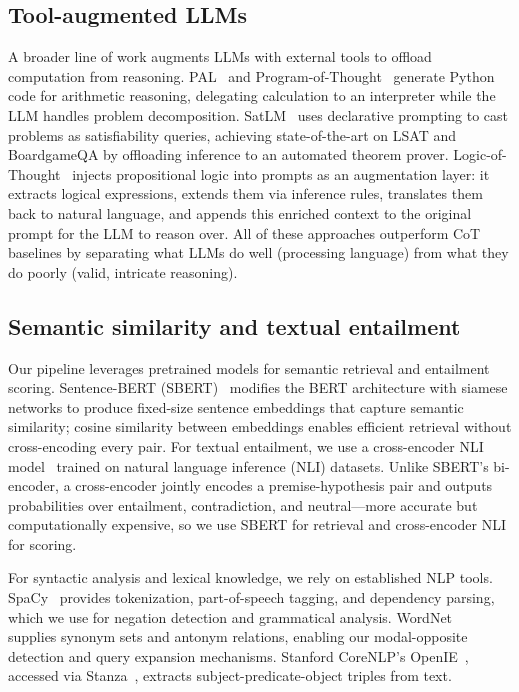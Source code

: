 \documentclass{article} %
\begin{document}
\subsection{Tool-augmented LLMs}
A broader line of work augments LLMs with external tools to offload computation from reasoning.
PAL~\citep{gao2023pal} and Program-of-Thought~\citep{chen2023pot} generate Python code for arithmetic reasoning, delegating calculation to an interpreter while the LLM handles problem decomposition.
SatLM~\citep{ye2023satlm} uses declarative prompting to cast problems as satisfiability queries, achieving state-of-the-art on LSAT and BoardgameQA by offloading inference to an automated theorem prover.
Logic-of-Thought~\citep{liu2024lot} injects propositional logic into prompts as an augmentation layer: it extracts logical expressions, extends them via inference rules, translates them back to natural language, and appends this enriched context to the original prompt for the LLM to reason over.
All of these approaches outperform CoT baselines by separating what LLMs do well (processing language) from what they do poorly (valid, intricate reasoning).

\subsection{Semantic similarity and textual entailment}
Our pipeline leverages pretrained models for semantic retrieval and entailment scoring. Sentence-BERT (SBERT)~\citep{reimers2019sbert} modifies the BERT architecture with siamese networks to produce fixed-size sentence embeddings that capture semantic similarity; cosine similarity between embeddings enables efficient retrieval without cross-encoding every pair. For textual entailment, we use a cross-encoder NLI model~\citep{conneau2017infersent} trained on natural language inference (NLI) datasets. Unlike SBERT's bi-encoder, a cross-encoder jointly encodes a premise-hypothesis pair and outputs probabilities over entailment, contradiction, and neutral---more accurate but computationally expensive, so we use SBERT for retrieval and cross-encoder NLI for scoring.

For syntactic analysis and lexical knowledge, we rely on established NLP tools. SpaCy~\citep{spacy} provides tokenization, part-of-speech tagging, and dependency parsing, which we use for negation detection and grammatical analysis. WordNet~\citep{miller1995wordnet} supplies synonym sets and antonym relations, enabling our modal-opposite detection and query expansion mechanisms. Stanford CoreNLP's OpenIE~\citep{angeli2015openie}, accessed via Stanza~\citep{qi2020stanza}, extracts subject-predicate-object triples from text.
\end{document}
